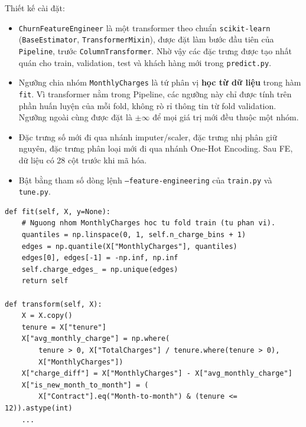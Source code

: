 Thiết kế cài đặt:
\begin{itemize}
    \item \texttt{ChurnFeatureEngineer} là một transformer theo chuẩn \texttt{scikit-learn} (\texttt{BaseEstimator}, \texttt{TransformerMixin}), được đặt làm bước đầu tiên của \texttt{Pipeline}, trước \texttt{ColumnTransformer}. Nhờ vậy các đặc trưng được tạo nhất quán cho train, validation, test và khách hàng mới trong \texttt{predict.py}.
    \item Ngưỡng chia nhóm \texttt{MonthlyCharges} là tứ phân vị \textbf{học từ dữ liệu} trong hàm \texttt{fit}. Vì transformer nằm trong Pipeline, các ngưỡng này chỉ được tính trên phần huấn luyện của mỗi fold, không rò rỉ thông tin từ fold validation. Ngưỡng ngoài cùng được đặt là $\pm\infty$ để mọi giá trị mới đều thuộc một nhóm.
    \item Đặc trưng số mới đi qua nhánh imputer/scaler, đặc trưng nhị phân giữ nguyên, đặc trưng phân loại mới đi qua nhánh One-Hot Encoding. Sau FE, dữ liệu có 28 cột trước khi mã hóa.
    \item Bật bằng tham số dòng lệnh \texttt{--feature-engineering} của \texttt{train.py} và \texttt{tune.py}.
\end{itemize}

\begin{lstlisting}[style=pythonstyle, caption={Một phần \texttt{ChurnFeatureEngineer} trong \texttt{src/features.py}}]
def fit(self, X, y=None):
    # Nguong nhom MonthlyCharges hoc tu fold train (tu phan vi).
    quantiles = np.linspace(0, 1, self.n_charge_bins + 1)
    edges = np.quantile(X["MonthlyCharges"], quantiles)
    edges[0], edges[-1] = -np.inf, np.inf
    self.charge_edges_ = np.unique(edges)
    return self

def transform(self, X):
    X = X.copy()
    tenure = X["tenure"]
    X["avg_monthly_charge"] = np.where(
        tenure > 0, X["TotalCharges"] / tenure.where(tenure > 0),
        X["MonthlyCharges"])
    X["charge_diff"] = X["MonthlyCharges"] - X["avg_monthly_charge"]
    X["is_new_month_to_month"] = (
        X["Contract"].eq("Month-to-month") & (tenure <= 12)).astype(int)
    ...
\end{lstlisting}
